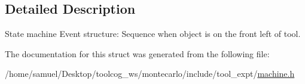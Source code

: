 \subsection{Detailed Description}
State machine Event structure\+: Sequence when object is on the front left of tool. 

The documentation for this struct was generated from the following file\+:\begin{DoxyCompactItemize}
\item 
/home/samuel/\+Desktop/toolcog\+\_\+ws/montecarlo/include/tool\+\_\+expt/\hyperlink{machine_8h}{machine.\+h}\end{DoxyCompactItemize}
